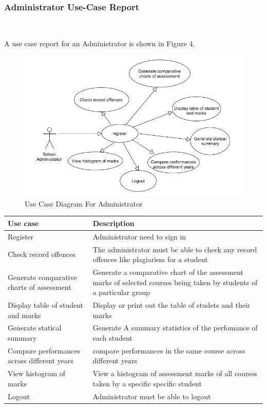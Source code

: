 	
	
	
	\clearpage
	\subsubsection{Administrator Use-Case Report}$\;\;\;\;\;\;\;\;\;\;\;\;\;\;\;\;\;\;\;\;\;\;\;$
	
	A use case report for an Administrator is shown in Figure 4.
	\begin{center}
		\begin{figure}[h]
			\centering
			\includegraphics[trim={0cm 0cm 0cm 0cm },clip,scale = 0.85]{AdminUsecase}
			\caption{Use Case Diagram For Administrator}
		\end{figure}
	\end{center}
	
	
	
	\begin{center}
		\begin{tabular}{ | p{3cm} | p{10cm}| }
			\hline
			\textbf{Use case}& \textbf{Description} \\ \hline
			Register & Administrator need to sign in \\ \hline
			Check record offences & The administrator must be able to check any record offences like plagiarism for a student   \\ \hline
			Generate comparative charts of assessment & Generate a comparative chart of the assessment marks of selected courses 
being taken by students of a particular group \\ \hline
Display table of student and marks & Display or print out the table
of studets and their marks\\ \hline
Generate statical summary & Generate A summary statistics of the perfomance of each student  \\ \hline
Compare performances across different years & compare performances in the same course across different years \\ \hline 
View histogram of marks & View a histogram of assessment marks
of all courses taken by a specific specific student  \\ \hline 

			Logout          & Administrator must be able to logout  \\ \hline
			
		\end{tabular}
	\end{center}
	
